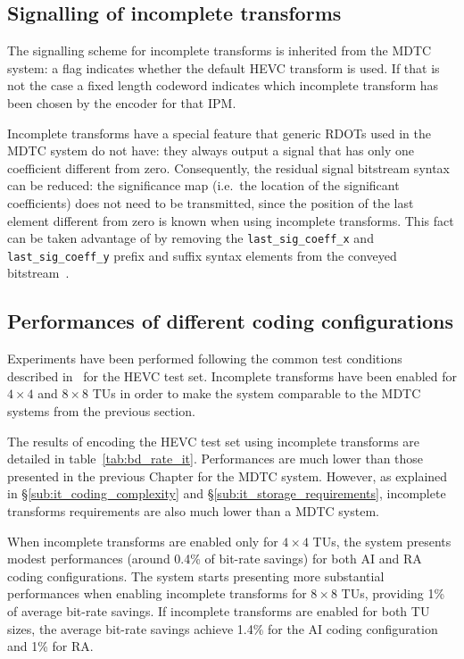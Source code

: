 \documentclass[11pt,a4paper,openright,twoside]{book}
\numberwithin{equation}{section} %
\numberwithin{figure}{section} %
\numberwithin{table}{section} %
\begin{document}
\subsection{Signalling of incomplete transforms}
\label{sub:it_signalling}

The signalling scheme for incomplete transforms is inherited from the
\ac{MDTC} system:
a flag indicates whether the default \ac{HEVC} transform is used.
If that is not the case a fixed length codeword indicates which incomplete
transform has been chosen by the encoder for that \ac{IPM}.

Incomplete transforms have a special feature that generic \acp{RDOT} used in
the \ac{MDTC} system do not have:
they always output a signal that has only one coefficient different from zero.
Consequently, the residual signal bitstream syntax can be reduced:
the significance map (i.e.\ the location of the significant coefficients) does
not need to be transmitted, since the position of the last element different
from zero is known when using incomplete transforms.
This fact can be taken advantage of by removing the
\texttt{last\_sig\_coeff\_x} and \texttt{last\_sig\_coeff\_y} prefix and
suffix syntax elements from the conveyed bitstream~\cite{JCTVC-G704}.

\subsection{Performances of different coding configurations}
\label{sub:it_performances}

Experiments have been performed following the common test conditions described
in~\cite{bossen-12-common-test-conditions} for the \ac{HEVC} test set.
Incomplete transforms have been enabled for $4\times4$ and $8\times8$
\acp{TU} in order to make the system comparable to the \ac{MDTC} systems from
the previous section.

The results of encoding the \ac{HEVC} test set using incomplete transforms are
detailed in table~\ref{tab:bd_rate_it}.
Performances are much lower than those presented in the previous Chapter for
the \ac{MDTC} system.
However, as explained in \S\ref{sub:it_coding_complexity} and
\S\ref{sub:it_storage_requirements}, incomplete transforms requirements are
also much lower than a \ac{MDTC} system.

When incomplete transforms are enabled only for $4\times4$ \acp{TU}, the
system presents modest performances (around 0.4\% of bit-rate savings) for
both \ac{AI} and \ac{RA} coding configurations.
The system starts presenting more substantial performances when enabling
incomplete transforms for $8\times8$ \acp{TU}, providing 1\% of average
bit-rate savings.
If incomplete transforms are enabled for both \ac{TU} sizes, the average
bit-rate savings achieve 1.4\% for the \ac{AI} coding configuration and 1\%
for \ac{RA}.
\end{document}
